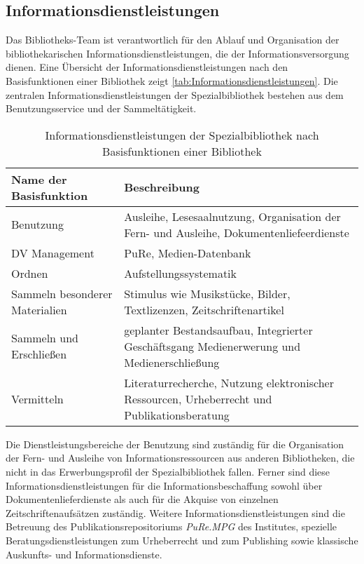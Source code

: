 \subsection{Informationsdienstleistungen}
Das Bibliotheks-Team ist verantwortlich für den Ablauf und Organisation der bibliothekarischen Informationsdienstleistungen, 
die der Informationsversorgung dienen. Eine Übersicht der Informationsdienstleistungen nach den Basisfunktionen\cite[S. 205]{RN200} einer Bibliothek 
zeigt \autoref{tab:Informationsdienstleistungen}. Die zentralen Informationsdienstleistungen der Spezialbibliothek bestehen 
aus dem Benutzungsservice und der Sammeltätigkeit. 
\begingroup
\setlength{\tabcolsep}{12pt} %
\renewcommand{\arraystretch}{1.5} 
\begin{table}[h]
    \centering
    \begin{adjustbox}{max width=\textwidth}
    \begin{tabular}{p{}p{}}
       \toprule
       \textbf{Name der Basisfunktion}          & \textbf{Beschreibung}\\
       \midrule
        Benutzung                               &Ausleihe, Lesesaalnutzung, Organisation der Fern- und Ausleihe, Dokumentenliefeerdienste\\
        DV Management                           &PuRe, Medien-Datenbank\\
        Ordnen                                  &Aufstellungssystematik\\
        Sammeln besonderer Materialien          &Stimulus wie Musikstücke, Bilder, Textlizenzen, Zeitschriftenartikel\\
        Sammeln und Erschließen                 &geplanter Bestandsaufbau, Integrierter Geschäftsgang Medienerwerung und Medienerschließung\\
        Vermitteln                              &Literaturrecherche, Nutzung elektronischer Ressourcen, Urheberrecht und Publikationsberatung\\
   
       \bottomrule
    \end{tabular}
    \end{adjustbox}
    \caption{%
        Informationsdienstleistungen der Spezialbibliothek nach Basisfunktionen einer Bibliothek
    }
    \label{tab:Informationsdienstleistungen}
    \end{table}
\endgroup

Die Dienstleistungsbereiche der Benutzung sind zuständig für die Organisation der Fern- und Ausleihe von Informationsressourcen 
aus anderen Bibliotheken, die nicht in das Erwerbungsprofil der Spezialbibliothek fallen. Ferner sind 
diese Informationsdienstleistungen für die Informationsbeschaffung sowohl über Dokumentenlieferdienste als auch für die 
Akquise von einzelnen Zeitschriftenaufsätzen zuständig. Weitere Informationsdienstleistungen sind
die Betreuung des Publikationsrepositoriums \textit{PuRe.MPG} des Institutes, spezielle Beratungsdienstleistungen 
zum Urheberrecht und zum Publishing sowie klassische Auskunfts- und Informationsdienste.


